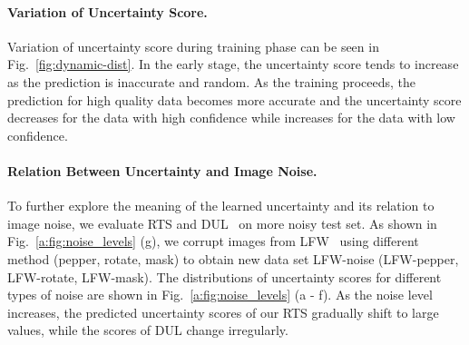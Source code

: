 \documentclass[letterpaper]{article} %
\begin{document}
\paragraph{Variation of Uncertainty Score.}
Variation of uncertainty score during training phase can be seen in Fig.~\ref{fig:dynamic-dist}. In the early stage, the uncertainty score tends to increase as the prediction is inaccurate and random. As the training proceeds, the prediction for high quality data becomes more accurate and the uncertainty score decreases for the data with high confidence while increases for the data with low confidence. 

\paragraph{Relation Between Uncertainty and Image Noise.}
To further explore the meaning of the learned uncertainty and its relation to image noise, we evaluate RTS and DUL~\cite{chang2020data} on more noisy test set. As shown in Fig.~\ref{a:fig:noise_levels} (g), we corrupt images from LFW~\cite{huang2008labeled} using different method (pepper, rotate, mask) to obtain new data set LFW-noise (LFW-pepper, LFW-rotate, LFW-mask). 
%
The distributions of uncertainty scores for different types of noise are shown in Fig.~\ref{a:fig:noise_levels} (a - f). As the noise level increases, the predicted uncertainty scores of our RTS gradually shift to large values, while the scores of DUL change irregularly. 
\end{document}
